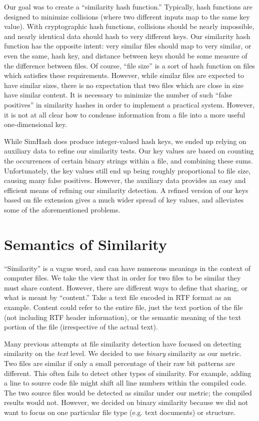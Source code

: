 \documentclass[10pt, twocolumn]{article}
\begin{document}
Our goal was to create a ``similarity hash function.''  Typically, hash functions are designed to minimize collisions (where two different inputs map to the same key value).  With cryptographic hash functions, collisions should be nearly impossible, and nearly identical data should hash to very different keys.  Our similarity hash function has the opposite intent: very similar files should map to very similar, or even the same, hash key, and distance between keys should be some measure of the difference between files.  Of course, ``file size'' is a sort of hash function on files which satisfies these requirements.  However, while similar files are expected to have similar sizes, there is no expectation that two files which are close in size have similar content.  It is necessary to minimize the number of such ``false positives'' in similarity hashes in order to implement a practical system.  However, it is not at all clear how to condense information from a file into a more useful one-dimensional key.

While SimHash does produce integer-valued hash keys, we ended up relying on auxiliary data to refine our similarity tests.  Our key values are based on counting the occurrences of certain binary strings within a file, and combining these sums.  Unfortunately, the key values still end up being roughly proportional to file size, causing many false positives.  However, the auxiliary data provides an easy and efficient means of refining our similarity detection.  A refined version of our keys based on file extension gives a much wider spread of key values, and alleviates some of the aforementioned problems.


\section{Semantics of Similarity}

``Similarity'' is a vague word, and can have numerous meanings in the context of computer files. We take the view that in order for two files to be similar they must share content. However, there are different ways to define that sharing, or what is meant by ``content.'' Take a text file encoded in RTF format as an example. Content could refer to the entire file, just the text portion of the file (not including RTF header information), or the semantic meaning of the text portion of the file (irrespective of the actual text). 

Many previous attempts at file similarity detection have focused on detecting similarity on the \emph{text} \cite{hpDocRepositories, hoad} level. We decided to use \emph{binary} similarity as our metric. Two files are similar if only a small percentage of their raw bit patterns are different. This often fails to detect other types of similarity.  For example, adding a line to source code file might shift all line numbers within the compiled code.  The two source files would be detected as similar under our metric; the compiled results would not.  However, we decided on binary similarity because we did not want to focus on one particular file type (e.g. text documents) or structure. 
\end{document}
